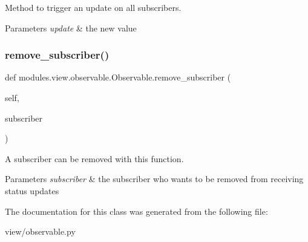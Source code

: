 Method to trigger an update on all subscribers. 


\begin{DoxyParams}{Parameters}
{\em update} & the new value \\
\hline
\end{DoxyParams}
\mbox{\label{classmodules_1_1view_1_1observable_1_1_observable_a1545faf481765b0a7a7dd17b3e7c9c35}} 
\subsubsection{\texorpdfstring{remove\+\_\+subscriber()}{remove\_subscriber()}}
{\footnotesize\ttfamily def modules.\+view.\+observable.\+Observable.\+remove\+\_\+subscriber (\begin{DoxyParamCaption}\item[{}]{self,  }\item[{}]{subscriber }\end{DoxyParamCaption})}



A subscriber can be removed with this function. 


\begin{DoxyParams}{Parameters}
{\em subscriber} & the subscriber who wants to be removed from receiving status updates \\
\hline
\end{DoxyParams}


The documentation for this class was generated from the following file\+:\begin{DoxyCompactItemize}
\item 
view/observable.\+py\end{DoxyCompactItemize}

